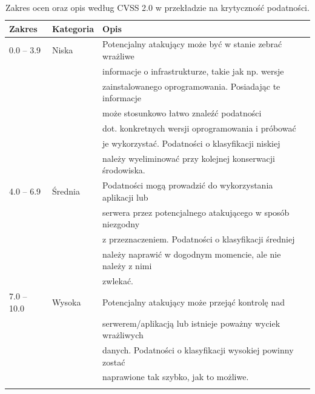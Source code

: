 \begin{table}[tbh]
\caption{Zakres ocen oraz opis według CVSS 2.0 w przekładzie na krytyczność podatności.}
\begin{center}
\label{tab:cvss_criticality_2}
\begin{tabular}{lll}
\hline \noalign {\smallskip}
\textbf{Zakres} & \textbf{Kategoria} & \textbf{Opis} \\
\hline \noalign {\smallskip}
0.0 – 3.9  & Niska	    & Potencjalny atakujący może być w stanie zebrać wrażliwe    \\
           &            & informacje o infrastrukturze, takie jak np. wersje        \\
           &            & zainstalowanego oprogramowania. Posiadając te informacje  \\
           &            & może stosunkowo łatwo znaleźć podatności                  \\
           &            & dot. konkretnych wersji oprogramowania i próbować         \\
           &            & je wykorzystać. Podatności o klasyfikacji niskiej         \\
           &            & należy wyeliminować przy kolejnej konserwacji środowiska. \\
\hline 
4.0 – 6.9  & Średnia    & Podatności mogą prowadzić do wykorzystania aplikacji lub \\
           &            & serwera przez potencjalnego atakującego w sposób niezgodny \\
           &            & z przeznaczeniem. Podatności o klasyfikacji średniej \\
           &            & należy naprawić w dogodnym momencie, ale nie należy z nimi \\
           &            & zwlekać. \\
\hline 
7.0 – 10.0 & Wysoka	    & Potencjalny atakujący może przejąć kontrolę nad            \\
           &            & serwerem/aplikacją lub istnieje poważny wyciek wrażliwych  \\
           &            & danych. Podatności o klasyfikacji wysokiej powinny zostać \\
           &            & naprawione tak szybko, jak to możliwe. \\
\hline \noalign {\smallskip}
\end{tabular}
\end{center}
\end{table}

